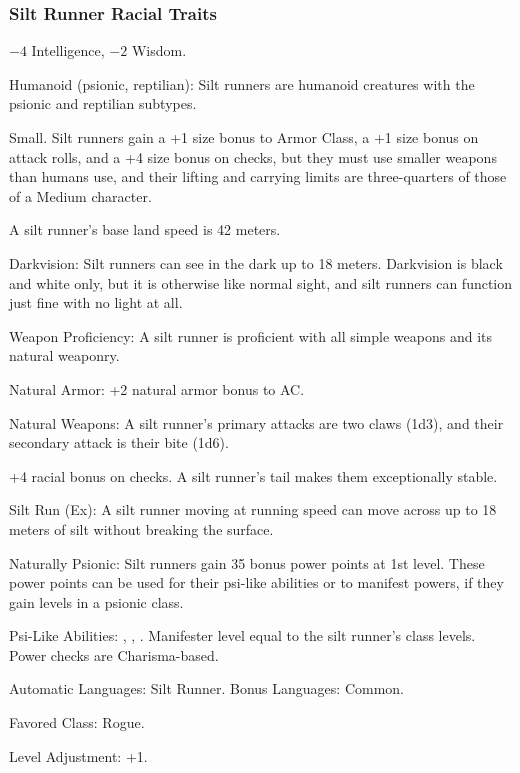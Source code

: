 \subsubsection{Silt Runner Racial Traits}
\begin{itemize*}
    \item $-4$ Intelligence, $-2$ Wisdom.
    \item Humanoid (psionic, reptilian): Silt runners are humanoid creatures with the psionic and reptilian subtypes.
    \item Small. Silt runners gain a +1 size bonus to Armor Class, a +1 size bonus on attack rolls, and a +4 size bonus on  checks, but they must use smaller weapons than humans use, and their lifting and carrying limits are three-quarters of those of a Medium character.
    \item A silt runner's base land speed is 42 meters.

    \item Darkvision: Silt runners can see in the dark up to 18 meters. Darkvision is black and white only, but it is otherwise like normal sight, and silt runners can function just fine with no light at all.

    \item Weapon Proficiency: A silt runner is proficient with all simple weapons and its natural weaponry.
    \item Natural Armor: +2 natural armor bonus to AC.
    \item Natural Weapons: A silt runner's primary attacks are two claws (1d3), and their secondary attack is their bite (1d6).

    \item +4 racial bonus on  checks. A silt runner's tail makes them exceptionally stable.

    \item Silt Run (Ex): A silt runner moving at running speed can move across up to 18 meters of silt without breaking the surface.
    \item Naturally Psionic: Silt runners gain 35 bonus power points at 1st level. These power points can be used for their psi-like abilities or to manifest powers, if they gain levels in a psionic class. %
    \item Psi-Like Abilities: 
        ,
        ,
        .
    Manifester level equal to the silt runner's class levels. Power checks are Charisma-based.

    \item Automatic Languages: Silt Runner. Bonus Languages: Common.
    \item Favored Class: Rogue.
    \item Level Adjustment: +1.
\end{itemize*}
